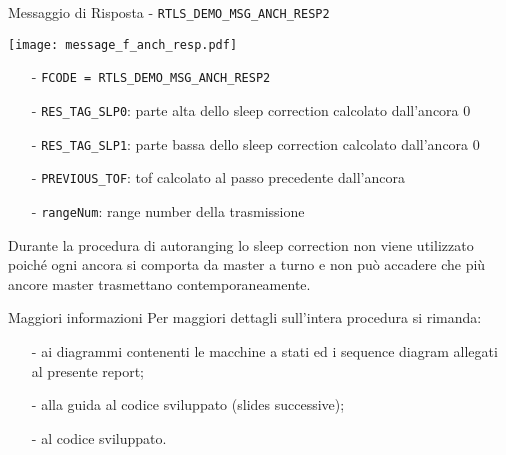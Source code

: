 \begin{frame}{Messaggio di Risposta - \lstinline!RTLS_DEMO_MSG_ANCH_RESP2!}
  \begin{center}
    \texttt{[image: message\_f\_anch\_resp.pdf]}
  \end{center}
  \begin{itemize}
  \item[-] \lstinline!FCODE = RTLS_DEMO_MSG_ANCH_RESP2!
  \item[-] \lstinline!RES_TAG_SLP0!: parte alta dello sleep correction calcolato dall'ancora 0
  \item[-] \lstinline!RES_TAG_SLP1!: parte bassa dello sleep correction calcolato dall'ancora 0
  \item[-] \lstinline!PREVIOUS_TOF!: tof calcolato al passo precedente dall'ancora
  \item[-] \lstinline!rangeNum!: range number della trasmissione
  \end{itemize}
  Durante la procedura di autoranging lo sleep correction non viene utilizzato poiché ogni ancora si comporta da master
  a turno e non può accadere che più ancore master trasmettano contemporaneamente.
\end{frame}

\begin{frame}{Maggiori informazioni}
  Per maggiori dettagli sull'intera procedura si rimanda:
  \begin{itemize}
  \item[-] ai diagrammi contenenti le macchine a stati ed i sequence diagram allegati al presente report;
  \item[-] alla guida al codice sviluppato (slides successive);
  \item[-] al codice sviluppato.
  \end{itemize}
\end{frame}

